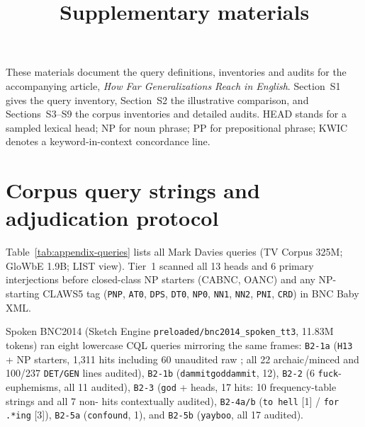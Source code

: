 \documentclass[12pt]{article}
\title{Supplementary materials}
\author{}
\date{}
\newcommand{\qsep}{\textbar\allowbreak}
\begin{document}
\maketitle

These materials document the query definitions, inventories and audits for the accompanying article, \emph{How Far Generalizations Reach in English}. Section~S1 gives the query inventory, Section~S2 the illustrative  comparison, and Sections~S3--S9 the corpus inventories and detailed audits. HEAD stands for a sampled lexical head; NP for noun phrase; PP for prepositional phrase; KWIC denotes a keyword-in-context concordance line.

\section{Corpus query strings and adjudication protocol}\label{supp:queries}

Table~\ref{tab:appendix-queries} lists all Mark Davies queries (TV Corpus 325M; GloWbE 1.9B; LIST view). Tier~1 scanned all 13 heads and 6 primary interjections before closed-class NP starters (CABNC, OANC) and any NP-starting CLAWS5 tag (\texttt{PNP}, \texttt{AT0}, \texttt{DPS}, \texttt{DT0}, \texttt{NP0}, \texttt{NN1}, \texttt{NN2}, \texttt{PNI}, \texttt{CRD}) in BNC Baby XML.

Spoken BNC2014 (Sketch Engine \texttt{preloaded/bnc2014\_spoken\_tt3}, 11.83M tokens) ran eight lowercase CQL queries mirroring the same frames: \texttt{B2-1a} (\texttt{H13} + NP starters, 1,311 hits including 60 unaudited raw ; all 22 archaic/minced and 100/237 \texttt{DET/GEN} lines audited), \texttt{B2-1b} (\texttt{dammit\qsep{}goddammit}, 12), \texttt{B2-2} (6 \texttt{fuck}-euphemisms, all 11 audited), \texttt{B2-3} (\texttt{god} + heads, 17 hits: 10  frequency-table strings and all 7 non- hits contextually audited), \texttt{B2-4a/b} (\texttt{to hell} [1] / \texttt{for .*ing} [3]), \texttt{B2-5a} (\texttt{confound}, 1), and \texttt{B2-5b} (\texttt{yay\qsep{}boo}, all 17 audited).
\end{document}

